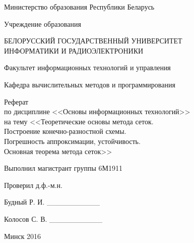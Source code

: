\begin{titlepage}
\thispagestyle{empty}
\setlength{\parindent}{0cm} %

{\centering{}
  Министерство образования Республики Беларусь

  \smallskip
  Учреждение образования

  БЕЛОРУССКИЙ ГОСУДАРСТВЕННЫЙ УНИВЕРСИТЕТ \\
  ИНФОРМАТИКИ И РАДИОЭЛЕКТРОНИКИ

  \smallskip
  Факультет информационных технологий и управления

  \smallskip
  Кафедра вычислительных методов и программирования\par
}

\vspace{50mm}

{\centering{}
  Реферат \\
  по дисциплине <<Основы информационных технологий>> \\
  на тему <<Теоретические основы метода сеток. \\
  Построение конечно-разностной схемы. \\
  Погрешность аппроксимации, устойчивость. \\
  Основная теорема метода сеток>>\par
}

\vspace{30mm}

\begin{minipage}{.55\linewidth}
  Выполнил магистрант группы 6М1911

  \smallskip
  Проверил д.ф.-м.н.
\end{minipage}
\hfill
\begin{minipage}{.4\linewidth}
  \begin{flushright}
    Будный Р. И. \_\_\_\_\_\_\_\_\_\_

    \smallskip
    Колосов С. В. \_\_\_\_\_\_\_\_\_\_
  \end{flushright}
\end{minipage}

\vfill
{\centering{}
  Минск 2016\par
}

\setlength{\parindent}{1.25cm} %
\end{titlepage}
